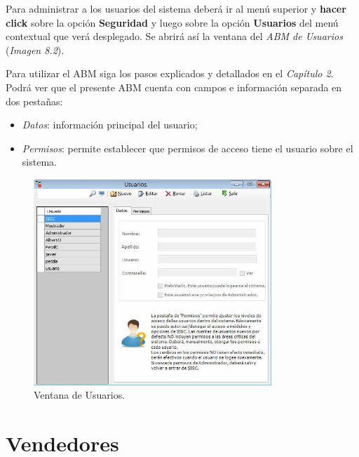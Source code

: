 \documentclass{book}
\begin{document}
Para administrar a los usuarios del sistema deberá ir al menú superior y \textbf{hacer click} sobre la opción \textbf{Seguridad} y luego sobre la opción \textbf{Usuarios} del menú contextual que verá desplegado. Se abrirá así la ventana del \textit{ABM de Usuarios} (\textit{Imagen 8.2}). 
\par
Para utilizar el ABM siga los pasos explicados y detallados en el \textit{Capítulo 2}. Podrá ver que el presente ABM cuenta con campos e información separada en dos pestañas:
\smallskip

\begin{itemize}
	\renewcommand{\labelitemi}{\scriptsize\tiny$\blacksquare$} 
	\itemsep=5pt \topsep=0pt \partopsep=0pt \parskip=0pt \parsep=0pt
	
	\item \textit{Datos}: información principal del usuario;

	\item \textit{Permisos}: permite establecer que permisos de acceso tiene el usuario sobre el sistema.

\end{itemize}
\smallskip


\begin{figure}[H]
	\centering
	\includegraphics[width=0.8\textwidth]{images/ventanas/ventana-20.jpg}
	\caption{Ventana de Usuarios.}
	\medskip
\end{figure}



\section{Vendedores}
\end{document}
